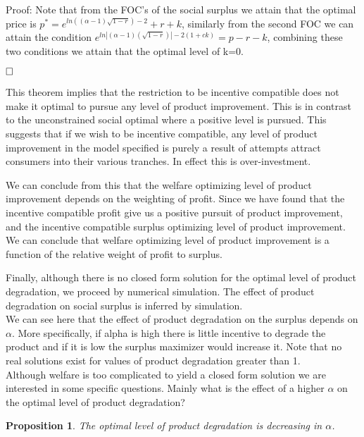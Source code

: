 \documentclass{article}
\newtheorem{proposition}{Proposition}
\begin{document}
Proof: Note that from the FOC's of the social surplus we attain that the optimal price is $p^* = e^{ln((\alpha-1)\sqrt{1-r}) -2} +r+k$, similarly from the second FOC we can attain the condition $e^{ln|(\alpha -1)(\sqrt{1-r})| -2(1+ck)} = p-r-k$, combining these two conditions we attain that the optimal level of k=0. 

$\hfill \square$

This theorem implies that the restriction to be incentive compatible does not make it optimal to pursue any level of product improvement. This is in contrast to the unconstrained social optimal where a positive level is pursued. This suggests that if we wish to be incentive compatible, any level of product improvement in the model specified is purely a result of attempts attract consumers into their various tranches. In effect this is over-investment. 

We can conclude from this that the welfare optimizing level of product improvement depends on the weighting of profit. Since we have found that the incentive compatible profit give us a positive pursuit of product improvement, and the incentive compatible surplus optimizing level of product improvement. We can conclude that welfare optimizing level of product improvement is a function of the relative weight of profit to surplus. 

Finally, although there is no closed form solution for the optimal level of product degradation, we proceed by numerical simulation. The effect of product degradation on social surplus  is inferred by simulation. \\



We can see here that the effect of product degradation on the surplus depends on $\alpha$. More specifically, if alpha is high there is little incentive to degrade the product and if it is low the surplus maximizer would increase it. Note that no real solutions exist for values of product degradation greater than 1. \\

Although welfare is too complicated to yield a closed form solution we are interested in some specific questions. Mainly what is the effect of a higher $\alpha$ on the optimal level of product degradation? 

\begin{proposition}
The optimal level of product degradation is decreasing in $\alpha$. 
\end{proposition}
\end{document}

